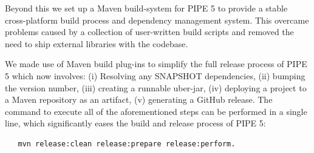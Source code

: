 Beyond this we set up a Maven build-system for PIPE 5 to provide a stable cross-platform build process and dependency management system. This overcame problems caused by a collection of user-written build scripts and removed the need to ship external libraries with the codebase.

We made use of Maven build plug-ins to simplify the full release process of PIPE 5 which now involves: (i) Resolving any SNAPSHOT dependencies, (ii) bumping the version number, (iii) creating a runnable uber-jar, (iv) deploying a project to a Maven repository as an artifact, (v) generating a GitHub release. The command to execute all of the aforementioned steps can be performed in a single line, which significantly eases the build and release process of PIPE 5:
\begin{lstlisting}
   mvn release:clean release:prepare release:perform.
\end{lstlisting}